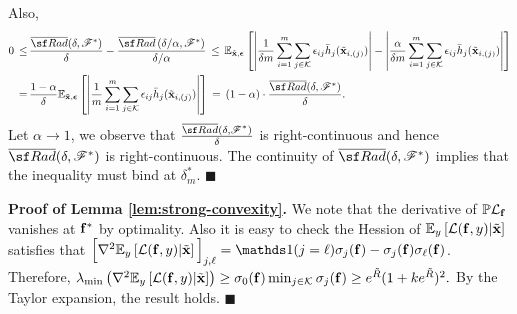 {    Also, 
    \begin{align*}
      0 \,\leq\, & \frac{\overline{\sf Rad}(\delta, \Fscr^*)}{\delta} - \frac{\overline{\sf Rad}\left({\delta}/{\alpha}, \Fscr^*\right)}{{\delta}/{\alpha}} \,\leq\, \E_{\tilde{\x},\epsvec}\left[
    \left|
    \frac{1}{\delta m}\sum_{i=1}^m\sum_{j \in \Kscr}\epsilon_{ij}\bar{h}_j(\tilde{\x}_{i,(j)})
    \right| - 
    \left|
    \frac{\alpha}{\delta m}\sum_{i=1}^m\sum_{j \in \Kscr}\epsilon_{ij}\bar{h}_j(\tilde{\x}_{i,(j)})
    \right| 
    \right]\\
    \,=\,&\frac{1-\alpha}{\delta}\E_{\tilde{\x},\epsvec}\left[
    \left|
    \frac{1}{m}\sum_{i=1}^m\sum_{j \in \Kscr}\epsilon_{ij}\bar{h}_j(\tilde{\x}_{i,(j)})
    \right|
    \right]\,=\, (1-\alpha)\cdot\frac{\overline{\sf Rad}(\delta, \Fscr^*)}{\delta}. 
    \end{align*}
    Let $\alpha \rightarrow 1$, we observe that $\frac{\overline{\sf Rad}(\delta, \Fscr^*)}{\delta}$ is right-continuous and hence 
    $\overline{\sf Rad}(\delta, \Fscr^*)$ is right-continuous. 
    The continuity of $\overline{\sf Rad}(\delta, \Fscr^*)$ implies that the inequality must bind at $\delta^*_m$.
    \hfill $\blacksquare$

    \noindent \textbf{Proof of Lemma \ref{lem:strong-convexity}.}
    We note that the derivative of $\mathbb{P} \mathcal{L}_{\mathbf{f}}$ vanishes at $\mathbf{f}^*$ by optimality. Also it is easy to check the Hession of $\mathbb{E}_{y}\left[\mathcal{L}(\mathbf{f}, y) | \tilde{\mathbf{x}}\right]$ satisfies that 
    $\Big[\nabla^2 \E_{y}\left[\Lcal(\fvec, y) | \tilde{\x}\right] \Big]_{j, \ell} = \Indicator(j = \ell)\sigma_j(\fvec) - \sigma_j(\fvec)\sigma_\ell(\fvec)$. 
    Therefore, 
    $
    \lambda_{\min}\left(\nabla^2 \mathbb{E}_{y}\left[\mathcal{L}(\mathbf{f}, y) | \tilde{\mathbf{x}}\right]\right) \geq \sigma_0(\mathbf{f})\min_{j \in \mathcal{K}} \sigma_j(\mathbf{f}) \geq e^{\tilde{R}}(1 + ke^{\tilde{R}})^2.
    $
    By the Taylor expansion, the result holds. 
    \hfill $\blacksquare$

}
